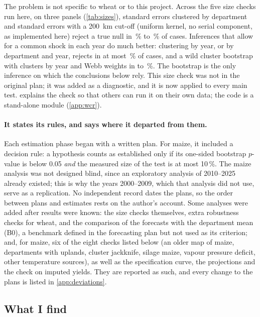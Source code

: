 The problem is not specific to wheat or to this project. Across the five size checks run here, on three panels (\cref{tab:sizes}), standard errors clustered by department and \textcite{conley1999} standard errors with a 200~km cut-off (uniform kernel, no serial component, as implemented here) reject a true null in \UsualSizeMin\,\% to \UsualSizeMax\,\% of cases. Inferences that allow for a common shock in each year do much better: clustering by year, or by department and year, rejects in at most \SizeTwoWayMax\,\% of cases, and a wild cluster bootstrap with clusters by year and Webb weights \parencite{cameron2008,webb2023} in \SizeWcrMin{} to \SizeWcrMax\,\%. The bootstrap is the only inference on which the conclusions below rely. This size check was not in the original plan; it was added as a diagnostic, and it is now applied to every main test.  explains the check so that others can run it on their own data; the code is a stand-alone module (\cref{app:wcr}).

\paragraph{It states its rules, and says where it departed from them.} Each estimation phase began with a written plan. For maize, it included a decision rule: a hypothesis counts as established only if its one-sided bootstrap $p$-value is below 0.05 \emph{and} the measured size of the test is at most 10\,\%. The maize analysis was not designed blind, since an exploratory analysis of 2010--2025 already existed; this is why the years 2000--2009, which that analysis did not use, serve as a replication. No independent record dates the plans, so the order between plans and estimates rests on the author's account. Some analyses were added after results were known: the size checks themselves, extra robustness checks for wheat, and the comparison of the forecasts with the department mean (B0), a benchmark defined in the forecasting plan but not used as its criterion; and, for maize, six of the eight checks listed below (an older map of maize, departments with uplands, cluster jackknife, silage maize, vapour pressure deficit, other temperature sources), as well as the specification curve, the projections and the check on imputed yields. They are reported as such, and every change to the plans is listed in \cref{app:deviations}.

\subsection*{What I find}

